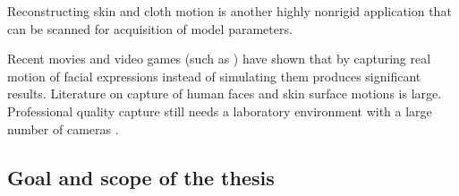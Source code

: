 Reconstructing skin and cloth motion is another highly nonrigid application that can be scanned for acquisition of model parameters. \cite{pritchard2003cloth}




Recent movies and video games (such as \cite{rockstar2011noire}) have shown that by capturing real motion of facial expressions instead of simulating them produces significant results.
Literature on capture of human faces and skin surface motions is large. \cite{deng2007computer}
Professional quality capture still needs a laboratory environment with a large number of cameras \cite{winder2008technical,motionscan}.






\subsection{Goal and scope of the thesis}

